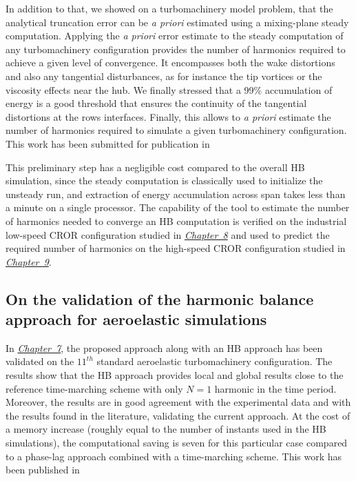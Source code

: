 In addition to that,
we showed on a turbomachinery model problem, that
the analytical truncation error can be \emph{a priori} 
estimated using a mixing-plane steady computation.
Applying the \emph{a priori} error estimate to 
the steady computation of any turbomachinery configuration
provides the number of harmonics required 
to achieve a given level of convergence.
It encompasses both the wake distortions and also
any tangential disturbances, as for instance
the tip vortices or the viscosity effects near the hub.
We finally stressed that a  99\% accumulation of energy
is a good threshold
that ensures the continuity of the tangential distortions at the rows
interfaces. Finally, this allows to \emph{a priori}
estimate the number of harmonics required to simulate
a given turbomachinery configuration.
This work has been submitted for publication in
\begin{quote}
\end{quote}

This preliminary step has a negligible cost compared to the overall HB
simulation, since the steady computation is classically used to initialize 
the unsteady run, and extraction of energy accumulation across span takes 
less than a minute on a single processor. The capability of the
tool to estimate the number of harmonics needed
to converge an HB computation is verified on the industrial low-speed CROR configuration
studied in \hyperref[cha:dream_ls_isolated]{\emph{Chapter~8}}
and used to predict the
required number of harmonics on the high-speed
CROR configuration studied in \hyperref[cha:dream_hs_isolated]{\emph{Chapter~9}}.

\subsection*{On the validation of the harmonic balance approach for aeroelastic simulations}

In \hyperref[cha:stcf11]{\emph{Chapter~7}}, 
the proposed  approach along with
an HB approach has been
validated on the $11^{th}$ standard aeroelastic turbomachinery
configuration.
The results show that the HB approach provides local
and global results close to the reference time-marching scheme 
with only $N=1$ harmonic in the time period. 
Moreover, the results are
in good agreement with the experimental data and with the results
found in the literature, validating the current approach.
At the cost of a memory
increase (roughly equal to the number of instants used in the HB
simulations), the computational saving is seven for this
particular case compared to a phase-lag approach combined
with a time-marching scheme. 
This work has been published in
\begin{quote}
\end{quote}

